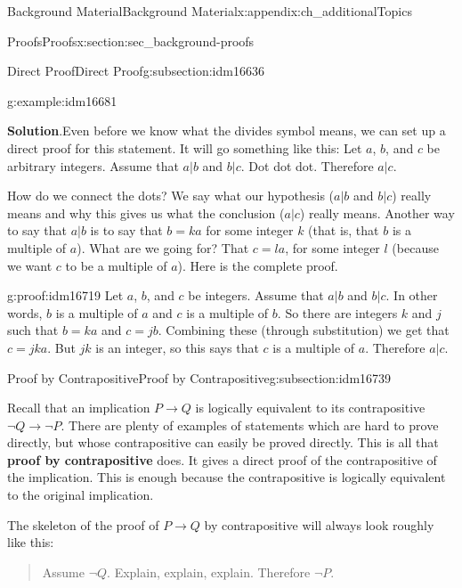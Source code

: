 \documentclass[oneside,10pt,]{book}
\newcommand{\terminology}[1]{\textbf{#1}}
\numberwithin{equation}{chapter}
\def\imp{\rightarrow}
\begin{document}
\begin{appendixptx}{Background Material}{}{Background Material}{}{}{x:appendix:ch_additionalTopics}
\begin{sectionptx}{Proofs}{}{Proofs}{}{}{x:section:sec_background-proofs}
\begin{subsectionptx}{Direct Proof}{}{Direct Proof}{}{}{g:subsection:idm16636}
\begin{example}{}{g:example:idm16681}
\par\smallskip%
\noindent\textbf{Solution}.\hypertarget{g:solution:idm16698}{}\quad{}Even before we know what the divides symbol means, we can set up a direct proof for this statement. It will go something like this: Let \(a\), \(b\), and \(c\) be arbitrary integers. Assume that \(a|b\) and \(b|c\). Dot dot dot. Therefore \(a|c\).%
\par
How do we connect the dots? We say what our hypothesis (\(a|b\) and \(b|c\)) really means and why this gives us what the conclusion (\(a|c\)) really means. Another way to say that \(a|b\) is to say that \(b = ka\) for some integer \(k\) (that is, that \(b\) is a multiple of \(a\)). What are we going for? That \(c = la\), for some integer \(l\) (because we want \(c\) to be a multiple of \(a\)). Here is the complete proof.%
\begin{proofptx}{}{g:proof:idm16719}
Let \(a\), \(b\), and \(c\) be integers. Assume that \(a|b\) and \(b|c\). In other words, \(b\) is a multiple of \(a\) and \(c\) is a multiple of \(b\). So there are integers \(k\) and \(j\) such that \(b = ka\) and \(c = jb\). Combining these (through substitution) we get that \(c = jka\). But \(jk\) is an integer, so this says that \(c\) is a multiple of \(a\). Therefore \(a|c\).%
\end{proofptx}
\end{example}
\end{subsectionptx}
%
%
\typeout{************************************************}
\typeout{************************************************}
%
\begin{subsectionptx}{Proof by Contrapositive}{}{Proof by Contrapositive}{}{}{g:subsection:idm16739}
%
\par
Recall that an implication \(P \imp Q\) is logically equivalent to its contrapositive \(\neg Q \imp \neg P\). There are plenty of examples of statements which are hard to prove directly, but whose contrapositive can easily be proved directly. This is all that \terminology{proof by contrapositive} does. It gives a direct proof of the contrapositive of the implication. This is enough because the contrapositive is logically equivalent to the original implication.%
\par
The skeleton of the proof of \(P \imp Q\) by contrapositive will always look roughly like this:%
\begin{quote}%
Assume \(\neg Q\). Explain, explain, \textellipsis{} explain. Therefore \(\neg P\).%

\end{quote}
\end{subsectionptx}
\end{sectionptx}
\end{appendixptx}
\end{document}

